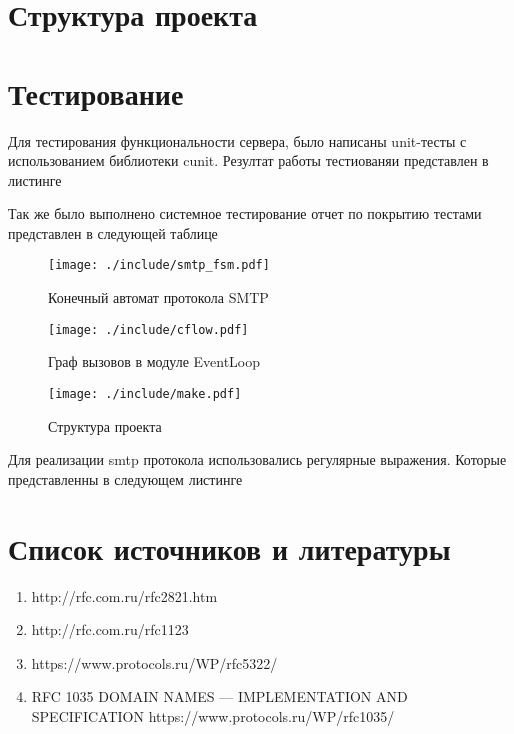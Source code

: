 \documentclass[a4paper,12pt]{extreport}
\begin{document}
	\section{Структура проекта}
	
	\section{Тестирование}
		Для тестирования функциональности сервера, было написаны unit-тесты
		с использованием библиотеки cunit. Резултат работы тестиованяи представлен
		в листинге 
		
		Так же было выполнено системное тестирование
		отчет по покрытию тестами представлен в следующей таблице
		\begin{landscape}
			
		\end{landscape}

	\begin{figure}
	\centering
	\texttt{[image: ./include/smtp\_fsm.pdf]}
	\caption{Конечный автомат протокола SMTP}
	\label{fig:smtp_fsm}
	\end{figure}

	\begin{figure}
	\centering
	\texttt{[image: ./include/cflow.pdf]}
	\caption{Граф вызовов в модуле EventLoop}
	\label{fig:event}
	\end{figure}

	\begin{figure}
	\centering
	\texttt{[image: ./include/make.pdf]}
	\caption{Структура проекта}
	\label{fig:make_server}
	\end{figure}

	Для реализации smtp протокола использовались регулярные выражения. Которые представленны в следующем листинге
	

	\section{Список источников и литературы}
	\begin{enumerate}
		\item http://rfc.com.ru/rfc2821.htm
		\item http://rfc.com.ru/rfc1123
		\item https://www.protocols.ru/WP/rfc5322/
		\item RFC 1035 DOMAIN NAMES — IMPLEMENTATION AND SPECIFICATION  https://www.protocols.ru/WP/rfc1035/
	\end{enumerate}
\end{document}
